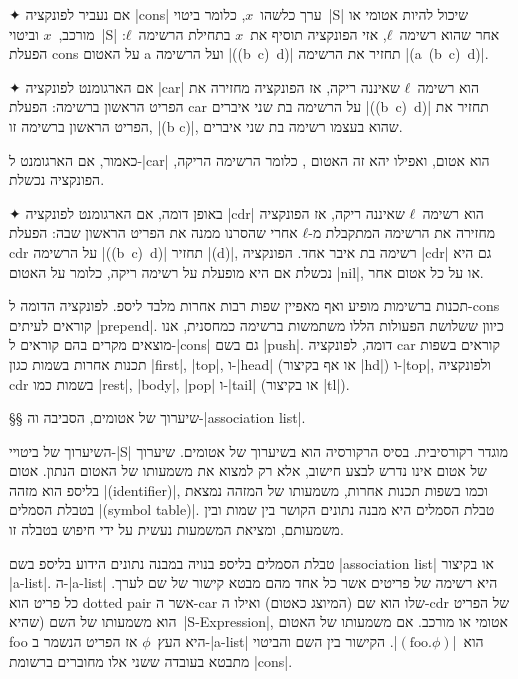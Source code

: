 \begin{enumerate}
  ✦ אם נעביר לפונקציה \T|cons| ערך כלשהו~$x$, כלומר ביטוי~\E|S| שיכול להיות
  אטומי או מורכב,~$x$ וביטוי~\E|S| אחר שהוא רשימה~$ℓ$, אזי הפונקציה תוסיף
  את~$x$ בתחילת הרשימה~$ℓ$: הפעלת cons על האטום a ועל הרשימה \E|((b~c)~d)|
  תחזיר את הרשימה \E|(a~(b~c)~d)|.

  ✦ אם הארגומנט לפונקציה \T|car| הוא רשימה~$ℓ$ שאיננה ריקה, אז הפונקציה מחזירה
  את הפריט הראשון ברשימה: הפעלת car על הרשימה בת שני איברים \E|((b~c)~d)| תחזיר
  את הפריט הראשון ברשימה זו, \E|(b c)|, שהוא בעצמו רשימה בת שני איברים.

  כאמור, אם הארגומנט ל-\E|car| הוא אטום, ואפילו יהא זה האטום ,
  כלומר הרשימה הריקה, הפונקציה נכשלת.

  ✦ באופן דומה, אם הארגומנט לפונקציה \T|cdr| הוא רשימה~$ℓ$ שאיננה ריקה, אז
  הפונקציה מחזירה את הרשימה המתקבלת מ-$ℓ$ אחרי שהסרנו ממנה את הפריט הראשון שבה:
  הפעלת cdr על הרשימה \E|((b~c)~d)| תחזיר \E|(d)|, רשימה בת איבר אחד. הפונקציה
  \E|cdr| גם היא נכשלת אם היא מופעלת על רשימה ריקה, כלומר על האטום \E|nil|, או
  על כל אטום אחר.
\end{enumerate}

תכנות ברשימות מופיע ואף מאפיין שפות רבות אחרות מלבד ליספ. לפונקציה הדומה
ל-cons קוראים לעיתים \E|prepend|. כיוון ששלושת הפעולות הללו משתמשות ברשימה
כמחסנית, אנו מוצאים מקרים בהם קוראים ל-\E|cons| גם בשם \E|push|. דומה,
לפונקציה car קוראים בשפות תכנות אחרות בשמות כגון \E|first|, \E|top|, ו-\E|head|
(או אף בקיצור \E|hd|) ו-\E|top|, ולפונקציה cdr בשמות כמו \E|rest|, \E|body|,
\E|pop| ו-\E|tail| (או בקיצור \E|tl|).

§§ שיערוך של אטומים, הסביבה וה-\E|association list|.

השיערוך של ביטויי-\E|S| מוגדר רקורסיבית. בסיס הרקורסיה הוא בשיערוך של אטומים.
שיערוך של אטום אינו נדרש לבצע חישוב, אלא רק למצוא את משמעותו של האטום הנתון.
אטום בליספ הוא מזהה \E|(identifier)|, וכמו בשפות תכנות אחרות, משמעותו של המזהה
נמצאת בטבלת הסמלים \E|(symbol table)|. טבלת הסמלים היא מבנה נתונים הקושר בין
שמות ובין משמעותם, ומציאת המשמעות נעשית על ידי חיפוש בטבלה זו.

טבלת הסמלים בליספ בנויה במבנה נתונים הידוע בליספ בשם \E|association list|
או בקיצור \E|a-list|. ה-\E|a-list| היא רשימה של פריטים אשר כל אחד מהם מבטא
קישור של שם לערך. כל פריט הוא dotted pair אשר ה-car שלו הוא שם (המיוצג כאטום)
ואילו ה-cdr של הפריט הוא משמעותו של השם (שהיא~\E|S-Expression|, אטומי או מורכב.
אם משמעותו של האטום foo היא העץ~$ϕ$ אז הפריט הנשמר ב-\E|a-list|
הוא~\E|$(\text{foo}.ϕ)$|. הקישור בין השם והביטוי מתבטא בעובדה ששני אלו מחוברים
ברשומת \E|cons|.

